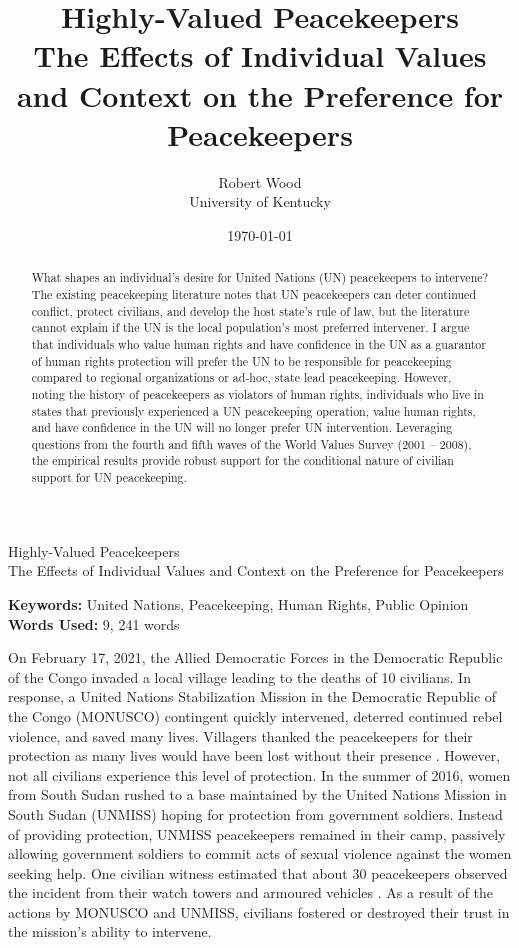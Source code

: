 \documentclass[12pt]{article}
\title{Highly-Valued Peacekeepers \\
\large The Effects of Individual Values and Context on the Preference for Peacekeepers}
\author{Robert Wood \\
University of Kentucky}
\date{\today}
\begin{document}

\begin{center}
{\LARGE Highly-Valued Peacekeepers} \\
The Effects of Individual Values and Context on the Preference for Peacekeepers
\end{center}

\begin{abstract}
\begin{singlespace}
What shapes an individual’s desire for United Nations (UN) peacekeepers to intervene? The existing peacekeeping literature notes that UN peacekeepers can deter continued conflict, protect civilians, and develop the host state’s rule of law, but the literature cannot explain if the UN is the local population's most preferred intervener. I argue that individuals who value human rights and have confidence in the UN as a guarantor of human rights protection will prefer the UN to be responsible for peacekeeping compared to regional organizations or ad-hoc, state lead peacekeeping. However, noting the history of peacekeepers as violators of human rights, individuals who live in states that previously experienced a UN peacekeeping operation, value human rights, and have confidence in the UN will no longer prefer UN intervention. Leveraging questions from the fourth and fifth waves of the World Values Survey (2001 – 2008), the empirical results provide robust support for the conditional nature of civilian support for UN peacekeeping.
\end{singlespace}
\end{abstract}
\begin{center}
\textbf{Keywords:} United Nations, Peacekeeping, Human Rights, Public Opinion \\
\textbf{Words Used:} 9, 241 words
\end{center}



\newpage

On February 17, 2021, the Allied Democratic Forces in the Democratic Republic of the Congo invaded a local village leading to the deaths of 10 civilians. In response, a United Nations Stabilization Mission in the Democratic Republic of the Congo (MONUSCO) contingent quickly intervened, deterred continued rebel violence, and saved many lives. Villagers thanked the peacekeepers for their protection as many lives would have been lost without their presence \citep{BBC_2021}. However, not all civilians experience this level of protection. In the summer of 2016, women from South Sudan rushed to a base maintained by the United Nations Mission in South Sudan (UNMISS) hoping for protection from government soldiers. Instead of providing protection, UNMISS peacekeepers remained in their camp, passively allowing government soldiers to commit acts of sexual violence against the women seeking help. One civilian witness estimated that about 30 peacekeepers observed the incident from their watch towers and armoured vehicles \citep{patinkin_2016}. As a result of the actions by MONUSCO and UNMISS, civilians fostered or destroyed their trust in the mission's ability to intervene.
\end{document}

